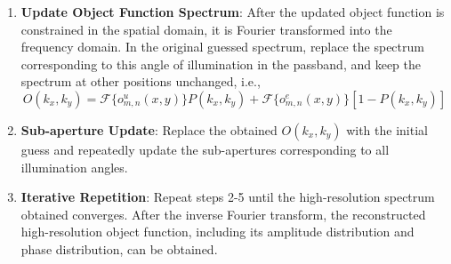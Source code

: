 \documentclass[journal,review,submit,pdftex,moreauthors]{Definitions/mdpi}
\begin{document}
\begin{enumerate}
    \item \textbf{Update Object Function Spectrum}: After the updated object function is constrained in the spatial domain, it is Fourier transformed into the frequency domain. In the original guessed spectrum, replace the spectrum corresponding to this angle of illumination in the passband, and keep the spectrum at other positions unchanged, i.e.,
    \begin{equation}
    O(k_x,k_y)=\mathscr{F}\{o^u_{m,n}(x,y)\}P(k_x,k_y)+\mathscr{F}\{o^e_{m,n}(x,y)\}[1-P(k_x,k_y)]
    \end{equation}
    
    \item \textbf{Sub-aperture Update}: Replace the obtained $O(k_x,k_y)$ with the initial guess and repeatedly update the sub-apertures corresponding to all illumination angles.
    
    \item \textbf{Iterative Repetition}: Repeat steps 2-5 until the high-resolution spectrum obtained converges. After the inverse Fourier transform, the reconstructed high-resolution object function, including its amplitude distribution and phase distribution, can be obtained.
\end{enumerate}
\end{document}
